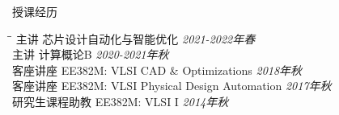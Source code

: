 \begin{rSection}{授课经历}

\begin{tabbing}
\hspace{1.5in}\= \hspace{4.4in}\= \kill
主讲 \> 芯片设计自动化与智能优化 \> {\em 2021-2022年春 } \\
主讲 \> 计算概论B \> {\em 2020-2021年秋 } \\
客座讲座 \> EE382M: VLSI CAD \& Optimizations \> {\em 2018年秋 } \\
客座讲座 \> EE382M: VLSI Physical Design Automation \> {\em 2017年秋 } \\
研究生课程助教 \> EE382M: VLSI I \> {\em 2014年秋 }
\end{tabbing}

\end{rSection}
